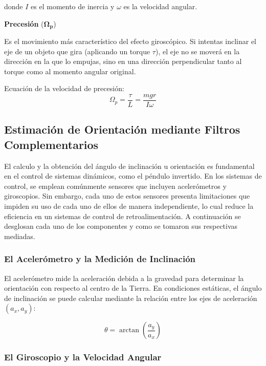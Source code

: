 \documentclass[12pt,letterpaper]{report}
\begin{document}
donde $I$ es el momento de inercia y $\omega$ es la velocidad angular.

\textbf{Precesión} ($\boldsymbol{\Omega_p}$)

\nopagebreak
Es el movimiento más característico del efecto giroscópico. Si intentas inclinar el eje de un objeto que gira (aplicando un torque $\tau$), el eje no se moverá en la dirección en la que lo empujas, sino en una dirección perpendicular tanto al torque como al momento angular original.

Ecuación de la velocidad de precesión:
\begin{equation}
\Omega_p = \frac{\tau}{L} = \frac{mgr}{I\omega}
\end{equation}

\subsection{Estimación de Orientación mediante Filtros Complementarios}

El calculo y la obtención del ángulo de inclinación u orientación es fundamental en el control de sistemas dinámicos, como el péndulo invertido. En los sistemas de control, se emplean comúnmente sensores que incluyen acelerómetros y giroscopios. Sin embargo, cada uno de estos sensores presenta limitaciones que impiden su uso de cada uno de ellos de manera independiente, lo cual reduce la eficiencia en un sistemas de control de retroalimentación. A continuación se desglosan cada uno de los componentes y como se tomaron sus respectivas mediadas.

\subsubsection{El Acelerómetro y la Medición de Inclinación}

El acelerómetro mide la aceleración debida a la gravedad para determinar la orientación con respecto al centro de la Tierra. En condiciones estáticas, el ángulo de inclinación se puede calcular mediante la relación entre los ejes de aceleración $(a_x, a_y)$:

\begin{equation}
\theta = \arctan\left(\frac{a_y}{a_x}\right)
\end{equation}

\subsubsection{El Giroscopio y la Velocidad Angular}
\end{document}

